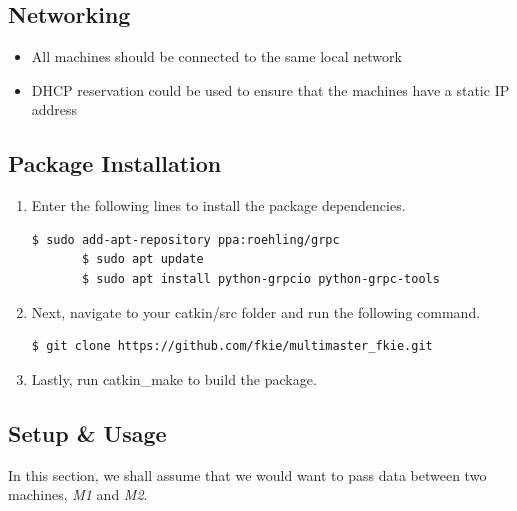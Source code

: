 \documentclass[11pt]{article}
\begin{document}
\subsection{Networking}
\begin{itemize}
 \item { All machines should be connected to the same local network}
 \item{ DHCP reservation could be used to ensure that the machines have a static IP address}
\end{itemize}
\subsection{Package Installation }
\begin{enumerate}
 \item {
       Enter the following lines to install the package dependencies.
       \begin{lstlisting}[language=bash]
       $ sudo add-apt-repository ppa:roehling/grpc
       $ sudo apt update
       $ sudo apt install python-grpcio python-grpc-tools
        \end{lstlisting}
       }
 \item{
       Next, navigate to your catkin/src folder and run the following command.
       \begin{lstlisting}[language=bash]
         $ git clone https://github.com/fkie/multimaster_fkie.git
        \end{lstlisting}
       }
 \item{
       Lastly, run catkin\_make to build the package.
       }
\end{enumerate}
\subsection{Setup \& Usage}

In this section, we shall assume that we would want to pass data between two machines, \emph{M1} and \emph{M2}.
\end{document}
